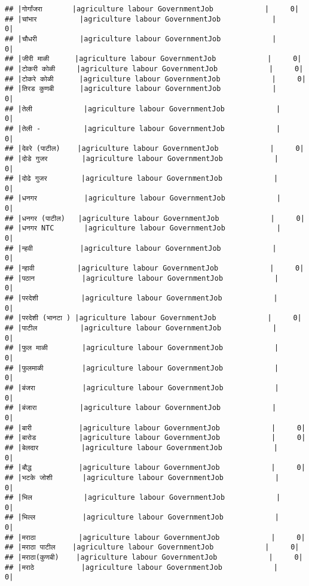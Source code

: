 \documentclass[
]{article}
\begin{document}
\begin{verbatim}
## |गोर्गांजरा       |agriculture labour GovernmentJob            |     0|
## |चांभार          |agriculture labour GovernmentJob            |     0|
## |चौधरी          |agriculture labour GovernmentJob            |     0|
## |जीरी माळी      |agriculture labour GovernmentJob            |     0|
## |टोकरी कोळी     |agriculture labour GovernmentJob            |     0|
## |टोकरे कोळी      |agriculture labour GovernmentJob            |     0|
## |तिरड कुणबी      |agriculture labour GovernmentJob            |     0|
## |तेली            |agriculture labour GovernmentJob            |     0|
## |तेली -          |agriculture labour GovernmentJob            |     0|
## |देवरे (पाटील)    |agriculture labour GovernmentJob            |     0|
## |दोडे गुजर        |agriculture labour GovernmentJob            |     0|
## |दोढे गुजर        |agriculture labour GovernmentJob            |     0|
## |धनगर           |agriculture labour GovernmentJob            |     0|
## |धनगर (पाटील)   |agriculture labour GovernmentJob            |     0|
## |धनगर NTC       |agriculture labour GovernmentJob            |     0|
## |न्हवी           |agriculture labour GovernmentJob            |     0|
## |न्हावी          |agriculture labour GovernmentJob            |     0|
## |पठान           |agriculture labour GovernmentJob            |     0|
## |परदेशी          |agriculture labour GovernmentJob            |     0|
## |परदेशी (भानटा ) |agriculture labour GovernmentJob            |     0|
## |पाटील          |agriculture labour GovernmentJob            |     0|
## |फुल माळी        |agriculture labour GovernmentJob            |     0|
## |फुलमाळी         |agriculture labour GovernmentJob            |     0|
## |बंजरा           |agriculture labour GovernmentJob            |     0|
## |बंजारा          |agriculture labour GovernmentJob            |     0|
## |बारी           |agriculture labour GovernmentJob            |     0|
## |बारोड          |agriculture labour GovernmentJob            |     0|
## |बेलदार          |agriculture labour GovernmentJob            |     0|
## |बौद्ध           |agriculture labour GovernmentJob            |     0|
## |भटके जोशी       |agriculture labour GovernmentJob            |     0|
## |भिल            |agriculture labour GovernmentJob            |     0|
## |भिल्ल           |agriculture labour GovernmentJob            |     0|
## |मराठा          |agriculture labour GovernmentJob            |     0|
## |मराठा पाटील    |agriculture labour GovernmentJob            |     0|
## |मराठा(कुणबी)    |agriculture labour GovernmentJob            |     0|
## |मराठे           |agriculture labour GovernmentJob            |     0|

\end{verbatim}
\end{document}
